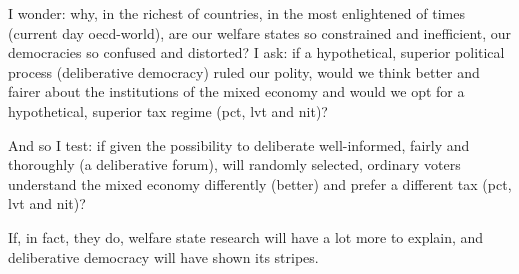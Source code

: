 I wonder:
why, in the richest of countries, in the most enlightened of times (current day \gls{oecd}-world), are our welfare states so constrained and inefficient, our democracies so confused and distorted?
I ask:
if a hypothetical, superior political process (deliberative democracy) ruled our polity, would we think better and fairer about the institutions of the mixed economy and would we opt for a hypothetical, superior tax regime (\gls{pct}, \gls{lvt} and \gls{nit})?

And so I test:
if given the possibility to deliberate well-informed, fairly and thoroughly (a deliberative forum), will randomly selected, ordinary voters understand the mixed economy differently (better) and prefer a different tax (\gls{pct}, \gls{lvt} and \gls{nit})?


If, in fact, they do, welfare state research will have a lot more to explain, and deliberative democracy will have shown its stripes.

%

